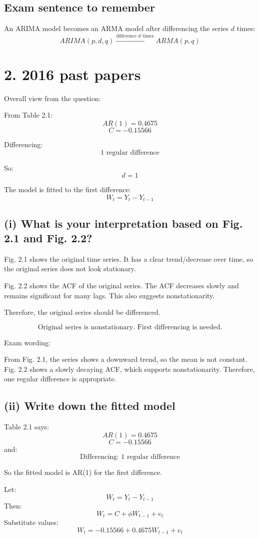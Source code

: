 \documentclass[11pt]{article}
\begin{document}
\subsection*{Exam sentence to remember}
An ARIMA model becomes an ARMA model after differencing the series $d$ times:
\[
\boxed{ARIMA(p,d,q) \xrightarrow{\text{difference } d \text{ times}} ARMA(p,q)}
\]

\section*{2. 2016 past papers}
Overall view from the question:

From Table 2.1:
\[
AR(1)=0.4675
\]
\[
C=-0.15566
\]

Differencing:
\[
\text{1 regular difference}
\]

So:
\[
d=1
\]

The model is fitted to the first difference:
\[
W_t = Y_t - Y_{t-1}
\]

\subsection*{(i) What is your interpretation based on Fig. 2.1 and Fig. 2.2?}
Fig. 2.1 shows the original time series. It has a clear trend/decrease over time, so the original series does not look stationary.

Fig. 2.2 shows the ACF of the original series. The ACF decreases slowly and remains significant for many lags. This also suggests nonstationarity.

Therefore, the original series should be differenced.

\[
\boxed{\text{Original series is nonstationary. First differencing is needed.}}
\]

Exam wording:

From Fig. 2.1, the series shows a downward trend, so the mean is not constant. Fig. 2.2 shows a slowly decaying ACF, which supports nonstationarity. Therefore, one regular difference is appropriate.

\subsection*{(ii) Write down the fitted model}
Table 2.1 says:
\[
AR(1)=0.4675
\]
\[
C=-0.15566
\]
and:
\[
\text{Differencing: 1 regular difference}
\]

So the fitted model is AR(1) for the first difference.

Let:
\[
W_t = Y_t - Y_{t-1}
\]
Then:
\[
W_t = C + \phi W_{t-1} + e_t
\]
Substitute values:
\[
\boxed{W_t = -0.15566 + 0.4675W_{t-1} + e_t}
\]
\end{document}
